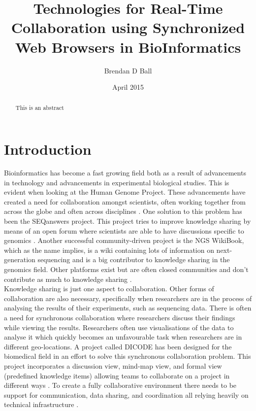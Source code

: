 \documentclass[prodmode,acmtecs]{acmsmall}
\begin{document}

\title{Technologies for Real-Time Collaboration using Synchronized Web Browsers in BioInformatics} %
\author{Brendan D Ball
}
\date{April 2015}

\begin{abstract}
This is an abstract
\end{abstract}

\maketitle
\section{Introduction}

Bioinformatics has become a fast growing field both as a result of advancements in technology and advancements in experimental biological studies. This is evident when looking at the Human Genome Project. These advancements have created a need for collaboration amongst scientists, often working together from across the globe and often across disciplines \cite{li2013ngs,lee2007facilitating,tsiliki2014datamining}. One solution to this problem has been the SEQanswers project. This project tries to improve knowledge sharing by means of an open forum where scientists are able to have discussions specific to genomics \cite{li2012seqanswers}. Another successful community-driven project is the NGS WikiBook, which as the name implies, is a wiki containing lots of information on next-generation sequencing and is a big contributor to knowledge sharing in the genomics field. Other platforms exist but are often closed communities and don't contribute as much to knowledge sharing \cite{li2013ngs}.\\

Knowledge sharing is just one aspect to collaboration. Other forms of collaboration are also necessary, specifically when researchers are in the process of analysing the results of their experiments, such as sequencing data. There is often a need for synchronous collaboration where researchers discuss their findings while viewing the results. Researchers often use visualisations of the data to analyse it which quickly becomes an unfavourable task when researchers are in different geo-locations. A project called DICODE has been designed for the biomedical field in an effort to solve this synchronous collaboration problem. This project incorporates a discussion view, mind-map view, and formal view (predefined knowledge items) allowing teams to collaborate on a project in different ways \cite{karacapilidis2011facilitating}. To create a fully collaborative environment there needs to be support for communication, data sharing, and coordination all relying heavily on technical infrastructure \cite{lee2007facilitating}.\\
\end{document}
